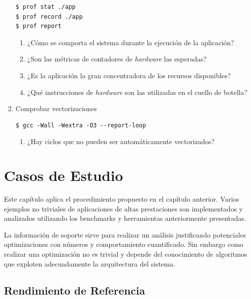 \documentclass[a4paper]{report}
\begin{document}
\begin{enumerate}
\begin{lstlisting}
$ prof stat ./app
$ prof record ./app
$ prof report
\end{lstlisting}

\begin{enumerate}
\item ¿Cómo se comporta el sistema durante la ejecución de la aplicación?
\item ¿Son las métricas de contadores de {\it hardware} las esperadas?
\item ¿Es la aplicación la gran concentradora de los recursos disponibles?
\item ¿Qué instrucciones de {\it hardware} son las utilizadas en el cuello de botella?
\end{enumerate}

\item Comprobar vectorizaciones

\begin{lstlisting}
$ gcc -Wall -Wextra -O3 --report-loop
\end{lstlisting}

\begin{enumerate}
\item ¿Hay ciclos que no pueden ser automáticamente vectorizados?
\end{enumerate}

\end{enumerate}

\chapter{Casos de Estudio}\label{chapter:cases}

Este capítulo aplica el procedimiento propuesto en el capítulo anterior. Varios ejemplos no triviales de aplicaciones de altas prestaciones son implementados y analizados utilizando los benchmarks y herramientas anteriormente presentadas.

\bigskip

La información de soporte sirve para realizar un análisis justificando potenciales optimizaciones con números y comportamiento cuantificado. Sin embargo como realizar una optimización no es trivial y depende del conocimiento de algoritmos que exploten adecuadamente la arquitectura del sistema.

\section{Rendimiento de Referencia}
\end{document}
